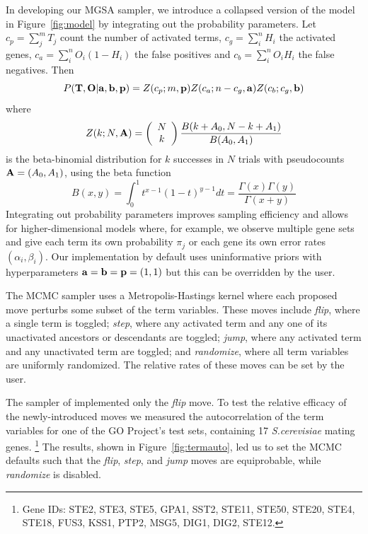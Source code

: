 In developing our MGSA sampler,
we introduce a collapsed version of the model in Figure~\ref{fig:model} by integrating out the probability parameters.
Let $c_p = \sum_j^m T_j$ count the number of activated terms,
$c_g = \sum_i^n H_i$ the activated genes,
$c_a = \sum_i^n O_i(1-H_i)$ the false positives and
$c_b = \sum_i^n O_i H_i$ the false negatives.
Then
\[
P({\bf T},{\bf O}|{\bf a},{\bf b},{\bf p}) =
Z(c_p;m,{\bf p})
Z(c_a;n-c_g,{\bf a})
Z(c_b;c_g,{\bf b})
\]
where
\[
Z(k;N,{\bf A}) =
\left( \begin{array}{c} N \\ k \end{array} \right)
\frac{B(k+A_0,N-k+A_1)}{B(A_0,A_1)}
\]
is the beta-binomial distribution for $k$ successes in $N$ trials with pseudocounts ${\bf A}=(A_0,A_1)$,
using the beta function
\[
B(x,y) = \int_0^1 t^{x-1}(1-t)^{y-1} dt = \frac{\Gamma(x)\Gamma(y)}{\Gamma(x+y)}
\]
Integrating out probability parameters improves sampling efficiency
and allows for higher-dimensional models where, for example, we observe multiple gene sets
and give each term its own probability $\pi_j$
or each gene its own error rates $(\alpha_i, \beta_i)$.
Our implementation by default uses uninformative priors with hyperparameters ${\bf a}={\bf b}={\bf p}=(1,1)$
but this can be overridden by the user.

The MCMC sampler uses a Metropolis-Hastings kernel where each proposed move perturbs some subset of the term variables.
These moves include {\em flip}, where a single term is toggled;
{\em step}, where any activated term and any one of its unactivated ancestors or descendants are toggled;
{\em jump}, where any activated term and any unactivated term are toggled; and
{\em randomize}, where all term variables are uniformly randomized.
The relative rates of these moves can be set by the user.

The sampler of \cite{pmid20172960} implemented only the {\em flip} move.
To test the relative efficacy of the newly-introduced moves we measured the autocorrelation of the term variables
for one of the GO Project's test sets, containing 17 {\em S.cerevisiae} mating genes.
\footnote{Gene IDs: STE2, STE3, STE5, GPA1, SST2, STE11, STE50, STE20, STE4, STE18, FUS3, KSS1, PTP2, MSG5, DIG1, DIG2, STE12.}
The results, shown in Figure~\ref{fig:termauto}, led us to set the MCMC defaults such that
the {\em flip}, {\em step}, and {\em jump} moves are equiprobable,
while {\em randomize} is disabled.

